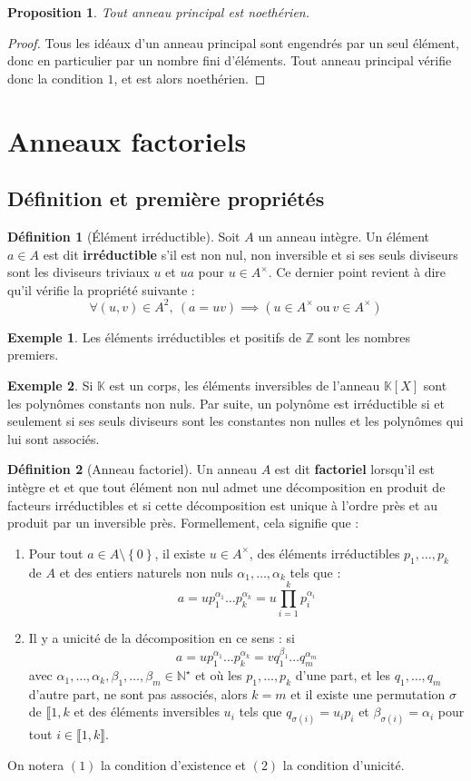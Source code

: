\documentclass[french]{book}
\newcommand{\N}{\mathbb{N}}
\newcommand{\Z}{\mathbb{Z}}
\newcommand{\K}{\mathbb{K}}
\newcommand{\st}{^\star}
\theoremstyle{plain}
\newtheorem{prop}{Proposition}[chapter]
\theoremstyle{definition}
\newtheorem{dfn}{Définition}[chapter]
\newtheorem{exa}{Exemple}[chapter]
\theoremstyle{remark}
\begin{document}
\begin{prop}
	Tout anneau principal est noethérien.
\end{prop}
\begin{proof}
	Tous les idéaux d'un anneau principal sont engendrés par un seul élément, donc en particulier par un nombre fini d'éléments. Tout anneau principal vérifie donc la condition $1$, et est alors noethérien.
\end{proof}
\section{Anneaux factoriels}
\subsection{Définition et première propriétés}
\begin{dfn}[Élément irréductible]
	Soit $A$ un anneau intègre. Un élément $a\in A$ est dit \textbf{irréductible} s'il est non nul, non inversible et si ses seuls diviseurs sont les diviseurs triviaux $u$ et $ua$ pour $u\in A^\times$. Ce dernier point revient à dire qu'il vérifie la propriété suivante : $$\forall (u,v)\in A^2,\ (a=uv)\implies(u\in A^\times\ \text{ou}\ v\in A^\times)$$
\end{dfn}
\begin{exa}
	Les éléments irréductibles et positifs de $\Z$ sont les nombres premiers.
\end{exa}
\begin{exa}
	Si $\K$ est un corps, les éléments inversibles de l'anneau $\K[X]$ sont les polynômes constants non nuls. Par suite, un polynôme est irréductible si et seulement si ses seuls diviseurs sont les constantes non nulles et les polynômes qui lui sont associés.
\end{exa}
\begin{dfn}[Anneau factoriel]
	Un anneau $A$ est dit \textbf{factoriel} lorsqu'il est intègre et et que tout élément non nul admet une décomposition en produit de facteurs irréductibles et si cette décomposition est unique à l'ordre près et au produit par un inversible près. Formellement, cela signifie que :
	\begin{enumerate}
		\item Pour tout $a\in A\setminus\left\{0\right\}$, il existe $u\in A^\times$, des éléments irréductibles $p_1,\ldots,p_k$ de $A$ et des entiers naturels non nuls $\alpha_1,\ldots,\alpha_k$ tels que : $$a=up_1^{\alpha_1}\ldots p_k^{\alpha_k}=u\prod_{i=1}^{k}p_i^{\alpha_i}$$
		\item Il y a unicité de la décomposition en ce sens : si $$a=up_1^{\alpha_1}\ldots p_k^{\alpha_k}=vq_1^{\beta_1}\ldots q_m^{\alpha_m}$$ avec $\alpha_1,\ldots,\alpha_k,\beta_1,\ldots,\beta_m\in\N\st$ et où les $p_1,\ldots,p_k$ d'une part, et les $q_1,\ldots,q_m$ d'autre part, ne sont pas associés, alors $k=m$ et il existe une permutation $\sigma$ de $\llbracket1,k$ et des éléments inversibles $u_i$ tels que $q_{\sigma(i)}=u_ip_i$ et $\beta_{\sigma(i)}=\alpha_i$ pour tout $i\in\llbracket1,k\rrbracket$.
	\end{enumerate}
	On notera $(1)$ la condition d'existence et $(2)$ la condition d'unicité.
\end{dfn}
\end{document}
